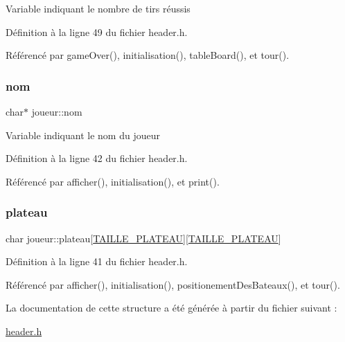 Variable indiquant le nombre de tirs réussis 

Définition à la ligne 49 du fichier header.\+h.



Référencé par game\+Over(), initialisation(), table\+Board(), et tour().

\mbox{\label{structjoueur_a5228c842828b2639253cb7db01e6f72d}} 
\subsubsection{\texorpdfstring{nom}{nom}}
{\footnotesize\ttfamily char$\ast$ joueur\+::nom}

Variable indiquant le nom du joueur 

Définition à la ligne 42 du fichier header.\+h.



Référencé par afficher(), initialisation(), et print().

\mbox{\label{structjoueur_a0de66c3578a57ff8e0ed1bf3d91c8e82}} 
\subsubsection{\texorpdfstring{plateau}{plateau}}
{\footnotesize\ttfamily char joueur\+::plateau\mbox{[}\mbox{\hyperlink{header_8h_adc3c2556e84bebbe78c8a87fc459a6f8}{T\+A\+I\+L\+L\+E\+\_\+\+P\+L\+A\+T\+E\+AU}}\mbox{]}\mbox{[}\mbox{\hyperlink{header_8h_adc3c2556e84bebbe78c8a87fc459a6f8}{T\+A\+I\+L\+L\+E\+\_\+\+P\+L\+A\+T\+E\+AU}}\mbox{]}}



Définition à la ligne 41 du fichier header.\+h.



Référencé par afficher(), initialisation(), positionement\+Des\+Bateaux(), et tour().



La documentation de cette structure a été générée à partir du fichier suivant \+:\begin{DoxyCompactItemize}
\item 
\mbox{\hyperlink{header_8h}{header.\+h}}\end{DoxyCompactItemize}
